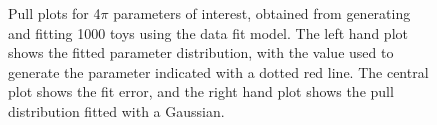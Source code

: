 \begin{figure}
\begin{tabular}{c}
  \end{tabular}
  \caption{Pull plots for 4$\pi$ parameters of interest, obtained from generating and fitting 1000 toys using the data fit model. The left hand plot shows the fitted parameter distribution, with the value used to generate the parameter indicated with a dotted red line. The central plot shows the fit error, and the right hand plot shows the pull distribution fitted with a Gaussian.}
\label{fig:4pi_pulls}
\end{figure}

